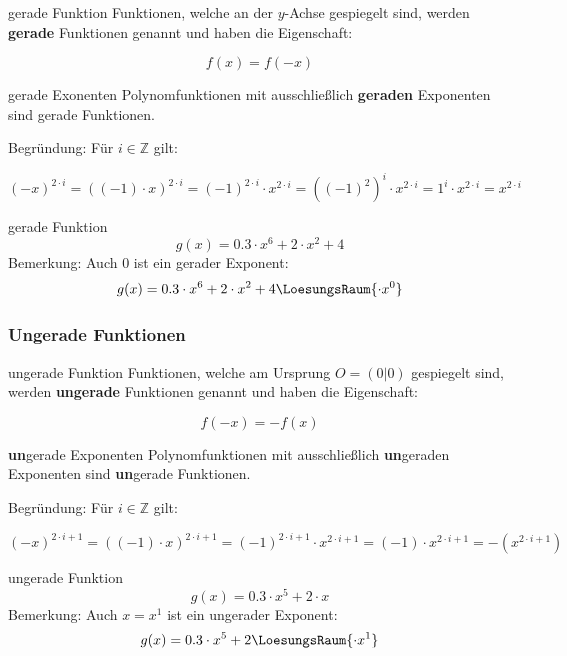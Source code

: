 \begin{definition}{gerade Funktion}{}
  Funktionen, welche an der $y$-Achse gespiegelt sind, werden
  \textbf{gerade} Funktionen genannt und haben die Eigenschaft:

  $$f(x) = f(-x)$$
\end{definition}


\begin{gesetz}{gerade Exonenten}{}
  Polynomfunktionen mit ausschließlich \textbf{geraden} Exponenten sind gerade Funktionen.

  Begründung: Für $i\in\mathbb{Z}$ gilt:

  $$(-x)^{2\cdot{}i} = ((-1)\cdot{}x)^{2\cdot{}i} = (-1)^{2\cdot{}i} \cdot{} x^{2\cdot{}i} = \left((-1)^2\right)^i \cdot{} x^{2\cdot{}i} = 1^i\cdot{}x^{2\cdot{}i} = x^{2\cdot{}i}$$
\end{gesetz}

\begin{beispiel}{gerade Funktion}{}
  $$g(x) = 0.3\cdot{}x^6 + 2\cdot{}x^2 + 4$$
  Bemerkung: Auch $0$ ist ein gerader Exponent:
  $$g(x) = 0.3\cdot{}x^6 + 2\cdot{}x^2 + 4\LoesungsRaum{\cdot{}x^0}$$  
\end{beispiel}
\newpage
\subsubsection{Ungerade Funktionen}
\begin{definition}{ungerade Funktion}{}
  Funktionen, welche am Ursprung $O = (0|0)$ gespiegelt sind, werden
  \textbf{ungerade} Funktionen genannt und haben die Eigenschaft:

  $$f(-x) = -f(x)$$
\end{definition}




\begin{gesetz}{\textbf{un}gerade Exponenten}{}
  Polynomfunktionen mit ausschließlich \textbf{un}geraden Exponenten sind \textbf{un}gerade Funktionen.

  Begründung: Für $i\in\mathbb{Z}$ gilt:

  $$(-x)^{2\cdot{}i + 1} = ((-1)\cdot{}x)^{2\cdot{}i+1} = (-1)^{2\cdot{}i+1} \cdot{} x^{2\cdot{}i+1} = (-1)\cdot{}x^{2\cdot{}i+1} = -\left(x^{2\cdot{}i+1}\right)$$

\end{gesetz}

\begin{beispiel}{ungerade Funktion}{}
  $$g(x) = 0.3\cdot{}x^5 + 2\cdot{}x $$
  Bemerkung: Auch $x=x^1$ ist ein ungerader Exponent:
  $$g(x) = 0.3\cdot{}x^5 + 2\LoesungsRaum{\cdot{}x^1} $$  
\end{beispiel}
\newpage


